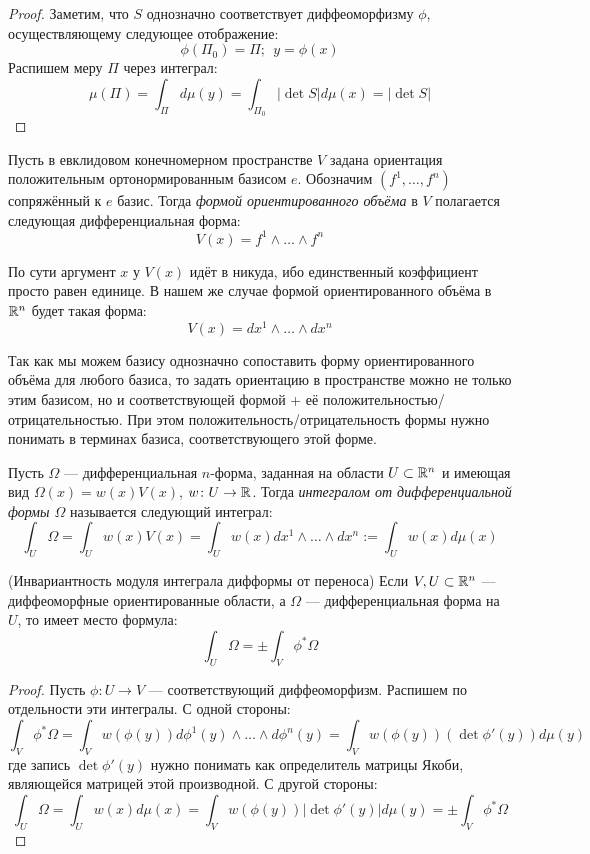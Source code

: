 \begin{proof}
	Заметим, что $S$ однозначно соответствует диффеоморфизму $\phi$, осуществляющему следующее отображение:
	\[
		\phi(\Pi_0) = \Pi;\ \ y = \phi(x)
	\]
	Распишем меру $\Pi$ через интеграл:
	\[
		\mu(\Pi) = \int_\Pi d\mu(y) = \int_{\Pi_0} |\det S| d\mu(x) = |\det S|
	\]
\end{proof}

\begin{definition}
	Пусть в евклидовом конечномерном пространстве $V$ задана ориентация положительным ортонормированным базисом $e$. Обозначим $(f^1, \ldots, f^n)$ сопряжённый к $e$ базис. Тогда \textit{формой ориентированного объёма} в $V$ полагается следующая дифференциальная форма:
	\[
		V(x) = f^1 \wedge \ldots \wedge f^n
	\]
\end{definition}

\begin{anote}
	По сути аргумент $x$ у $V(x)$ идёт в никуда, ибо единственный коэффициент просто равен единице. В нашем же случае формой ориентированного объёма в $\mathbb{R}^n$ будет такая форма:
	\[
		V(x) = dx^1 \wedge \ldots \wedge dx^n
	\]
\end{anote}

\begin{anote}
	Так как мы можем базису однозначно сопоставить форму ориентированного объёма для любого базиса, то задать ориентацию в пространстве можно не только этим базисом, но и соответствующей формой + её положительностью/отрицательностью. При этом положительность/отрицательность формы нужно понимать в терминах базиса, соответствующего этой форме.
\end{anote}

\begin{definition}
	Пусть $\Omega$ --- дифференциальная $n$-форма, заданная на области $U \subset \mathbb{R}^n$ и имеющая вид $\Omega(x) = w(x)V(x)$, $w \colon U \to \mathbb{R}$. Тогда \textit{интегралом от дифференциальной формы $\Omega$} называется следующий интеграл:
	\[
		\int_U \Omega = \int_U w(x)V(x) = \int_U w(x)dx^1 \wedge \ldots \wedge dx^n := \int_U w(x)d\mu(x)
	\]
\end{definition}

\begin{proposition} (Инвариантность модуля интеграла дифформы от переноса)
	Если $V, U \subset \mathbb{R}^n$ --- диффеоморфные ориентированные области, а $\Omega$ --- дифференциальная форма на $U$, то имеет место формула:
	\[
		\int_U \Omega = \pm\int_V \phi^*\Omega
	\]
\end{proposition}

\begin{proof}
	Пусть $\phi \colon U \to V$ --- соответствующий диффеоморфизм. Распишем по отдельности эти интегралы. С одной стороны:
	\[
		\int_V \phi^*\Omega = \int_V w(\phi(y))d\phi^1(y) \wedge \ldots \wedge d\phi^n(y) = \int_V w(\phi(y))(\det \phi'(y))d\mu(y)
	\]
	где запись $\det \phi'(y)$ нужно понимать как определитель матрицы Якоби, являющейся матрицей этой производной. С другой стороны:
	\[
		\int_U \Omega = \int_U w(x)d\mu(x) = \int_V w(\phi(y)) |\det \phi'(y)|d\mu(y) = \pm \int_V \phi^*\Omega
	\]
\end{proof}